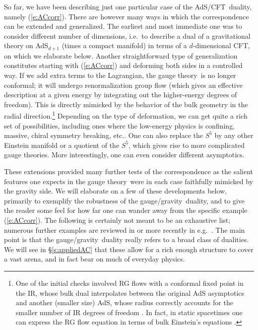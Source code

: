 \documentclass[12pt]{article}
\def\sect#1{\S\ref{#1}}
\def\req#1{(\ref{#1})}
\def\AC{AdS/CFT}
\def\GG{gauge/gravity}
\def\GT{gauge theory}
\begin{document}
So far, we have been describing just one particular case of the \AC\ duality, namely \req{e:ACcorr}.  There are however many ways in which the correspondence can be extended and generalized.  The earliest and most immediate one was to consider different number of dimensions, i.e.\ to describe a dual of a gravitational theory on AdS$_{d+1}$ (times a compact manifold) in terms of a $d$-dimensional CFT, on which we elaborate below.  
Another straightforward type of generalization constitutes starting with \req{e:ACcorr} and deforming both sides in a controlled way.  If we add extra terms to the Lagrangian, the \GT\ is no longer conformal; it will undergo renormalization group flow (which gives an effective description at a given energy by integrating out the higher-energy degrees of freedom).  This is directly mimicked by the behavior of the bulk geometry in the radial direction.\footnote{
One of the initial checks involved RG flows with a conformal fixed point in the IR, whose bulk dual interpolates between the original AdS asymptotics and another (smaller size) AdS, whose radius correctly accounts for the smaller number of IR degrees of freedom
\cite{Freedman:1999gp}.
In fact, in static spacetimes one can express the RG flow equation in terms of bulk Einstein's equations \cite{deBoer:1999xf}.
}  Depending on the type of deformation, we can get quite a rich set of possibilities, including ones where the  low-energy physics is confining, massive, chiral symmetry breaking, etc..  One can also replace the $S^5$ by any other Einstein manifold or a quotient of the $S^5$, which gives rise to more complicated gauge theories.
More interestingly, one can even consider different asymptotics.  

These extensions provided many further tests of the correspondence as the salient features one expects in the \GT\ were in each case faithfully mimicked by the gravity side.  
We will elaborate on a few of these developments below, primarily to exemplify the robustness of the \GG\ duality, and to give the reader some feel for how far one can wander away from the specific example \req{e:ACcorr}.  The following is certainly not meant to be an exhaustive list; numerous further examples are reviewed in \cite{Aharony:1999ti} or more recently in e.g.\ \cite{Polchinski:2010hw}.
The main point is that the \GG\ duality really refers to a broad class of dualities.  We will see in \sect{s:appliedAC}  that these allow for a rich enough structure to cover a vast arena, and in fact bear on much of everyday physics.
\end{document}
